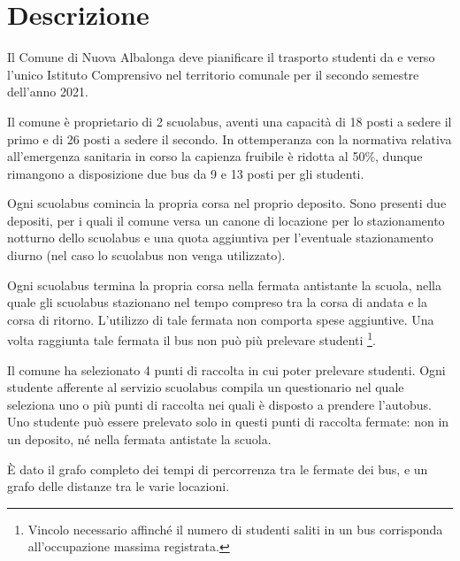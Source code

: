 
\chapter{Descrizione}  %
\label{cha:descrizione}
\ifpdf
    \graphicspath{{Chapter2/Figs/Raster/}{Chapter2/Figs/PDF/}{Chapter2/Figs/}}
\else
    \graphicspath{{Chapter2/Figs/Vector/}{Chapter2/Figs/}}
\fi

Il Comune di Nuova Albalonga deve pianificare il trasporto studenti da e verso l'unico Istituto Comprensivo nel territorio comunale per il secondo semestre dell'anno 2021.

Il comune è proprietario di 2 scuolabus, aventi una capacità di 18 posti a sedere il primo e di 26 posti a sedere il secondo. In ottemperanza con la normativa relativa all'emergenza sanitaria in corso la capienza fruibile è ridotta al 50\%, dunque rimangono a disposizione due bus da 9 e 13 posti per gli studenti.

Ogni scuolabus comincia la propria corsa nel proprio deposito. Sono presenti due depositi, per i quali il comune versa un canone di locazione per lo stazionamento notturno dello scuolabus e una quota aggiuntiva per l'eventuale stazionamento diurno (nel caso lo scuolabus non venga utilizzato).

Ogni scuolabus termina la propria corsa nella fermata antistante la scuola, nella quale gli scuolabus stazionano nel tempo compreso tra la corsa di andata e la corsa di ritorno. L'utilizzo di tale fermata non comporta spese aggiuntive. Una volta raggiunta tale fermata il bus non può più prelevare studenti \footnote{Vincolo necessario affinché il numero di studenti saliti in un bus corrisponda all'occupazione massima registrata.}.

Il comune ha selezionato 4 punti di raccolta in cui poter prelevare studenti. Ogni studente afferente al servizio scuolabus compila un questionario nel quale seleziona uno o più punti di raccolta nei quali è disposto a prendere l'autobus. Uno studente può essere prelevato solo in questi punti di raccolta fermate: non in un deposito, né nella fermata antistate la scuola.

È dato il grafo completo dei tempi di percorrenza tra le fermate dei bus, e un grafo delle distanze tra le varie locazioni.

